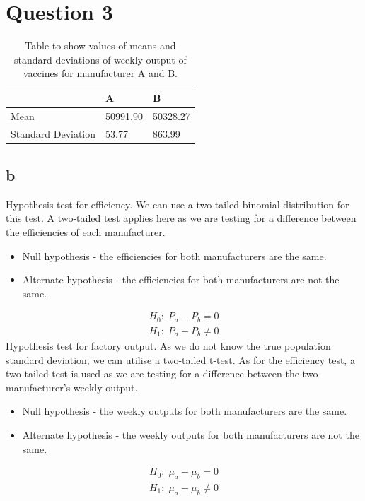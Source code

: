 \documentclass[11pt]{article}
\numberwithin{equation}{section}
\begin{document}
\section{Question 3}

\begin{table}[H]
    \centering
    \begin{tabular}{lll}
        \toprule
        & \textbf{A} & \textbf{B}\\
        \midrule
        Mean & 50991.90 & 50328.27\\
        Standard Deviation & 53.77 & 863.99\\
        \bottomrule
    \end{tabular}
    \caption{Table to show values of means and standard deviations of weekly output of vaccines for manufacturer A and B.}
\end{table}
\subsection{b}
Hypothesis test for efficiency. We can use a two-tailed binomial distribution for this test. A two-tailed test applies here as we are testing for a difference between the efficiencies of each manufacturer. \begin{itemize}
    \item Null hypothesis - the efficiencies for both manufacturers are the same.
    \item Alternate hypothesis - the efficiencies for both manufacturers are not the same.
\end{itemize}
\begin{align}
    H_0: \; P_a - P_b = 0\\
    H_1: \; P_a - P_b \neq 0
\end{align}
Hypothesis test for factory output. As we do not know the true population standard deviation, we can utilise a two-tailed t-test. As for the efficiency test, a two-tailed test is used as we are testing for a difference between the two manufacturer's weekly output.
\begin{itemize}
    \item Null hypothesis - the weekly outputs for both manufacturers are the same.
    \item Alternate hypothesis - the weekly outputs for both manufacturers are not the same.
\end{itemize}
\begin{align}
    H_0: \; \mu_a - \mu_b = 0\\
    H_1: \; \mu_a - \mu_b \neq 0 
\end{align}
\end{document}
